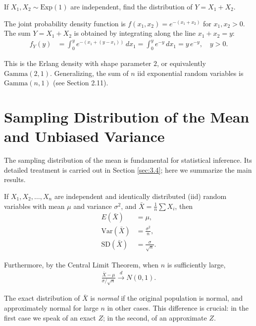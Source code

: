 \begin{ejemplo}
 \label{exmp:3.2.5}
If $X_1, X_2 \sim \text{Exp}(1)$ are independent, find the distribution of $Y = X_1 + X_2$.
\end{ejemplo}

\begin{solucion}
The joint probability density function is $f(x_1, x_2) = e^{-(x_1+x_2)}$ for $x_1, x_2 > 0$. The sum $Y = X_1 + X_2$ is obtained by integrating along the line $x_1 + x_2 = y$:
\begin{align}
 f_Y(y) &= \int_0^y e^{-(x_1 + (y-x_1))}\,dx_1 = \int_0^y e^{-y}\,dx_1 = y\,e^{-y}, \quad y > 0.
\end{align}

This is the Erlang density with shape parameter $2$, or equivalently $\text{Gamma}(2, 1)$. Generalizing, the sum of $n$ iid exponential random variables is $\text{Gamma}(n, 1)$ (see Section 2.11).
\end{solucion}



\section{Sampling Distribution of the Mean and Unbiased Variance}

The sampling distribution of the mean is fundamental for statistical inference. Its detailed treatment is carried out in Section \ref{sec:3.4}; here we summarize the main results.

If $X_1, X_2, \ldots, X_n$ are independent and identically distributed (iid) random variables with mean $\mu$ and variance $\sigma^2$, and $\bar{X} = \frac{1}{n}\sum X_i$, then
\begin{align}
 \label{eq:3.2.7}
 E(\bar{X}) &= \mu, \\
 \label{eq:3.2.8}
 \text{Var}(\bar{X}) &= \frac{\sigma^2}{n}, \\
 \label{eq:3.2.9}
 \text{SD}(\bar{X}) &= \frac{\sigma}{\sqrt{n}}.
\end{align}

Furthermore, by the Central Limit Theorem, when $n$ is sufficiently large,
\begin{align}
 \label{eq:3.2.10}
 \frac{\bar{X} - \mu}{\sigma/\sqrt{n}} \xrightarrow{d} N(0,1).
\end{align}

\begin{observacion}
The exact distribution of $\bar{X}$ is \emph{normal} if the original population is normal, and approximately normal for large $n$ in other cases. This difference is crucial: in the first case we speak of an exact $Z$; in the second, of an approximate $Z$.
\end{observacion}



